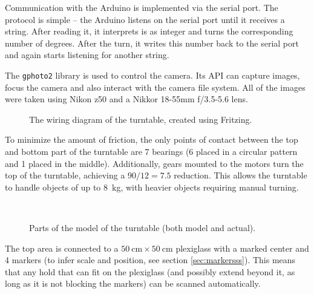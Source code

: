 Communication with the Arduino is implemented via the serial port.
The protocol is simple -- the Arduino listens on the serial port until it receives a string.
After reading it, it interprets is as integer and turns the corresponding number of degrees.
After the turn, it writes this number back to the serial port and again starts listening for another string.

The \verb|gphoto2| library is used to control the camera.
Its API can capture images, focus the camera and also interact with the camera file system.
All of the images were taken using Nikon z50 and a Nikkor 18-55mm f/3.5-5.6 lens.

\begin{figure}
	\centering
	
	\caption{The wiring diagram of the turntable, created using Fritzing.}
	\label{fig:wiring}
\end{figure}

To minimize the amount of friction, the only points of contact between the top and bottom part of the turntable are 7 bearings (6 placed in a circular pattern and 1 placed in the middle).
Additionally, gears mounted to the motors turn the top of the turntable, achieving a $90/12 = 7.5$ reduction.
This allows the turntable to handle objects of up to \SI{8}{\kilo\gram}, with heavier objects requiring manual turning.

\begin{figure}[h]
	\centering
	\hfill
	\hfill
	\\
	\hfill
	\hfill
	\hspace{1.2em}
	\caption{Parts of the model of the turntable (both model and actual). }%
	\label{fig:turntable}
\end{figure}

The top area is connected to a $\SI{50}{\centi\meter} \times \SI{50}{\centi\meter}$ plexiglass with a marked center and 4 markers (to infer scale and position, see section \ref{sec:markersss}). This means that any hold that can fit on the plexiglass (and possibly extend beyond it, as long as it is not blocking the markers) can be scanned automatically.

